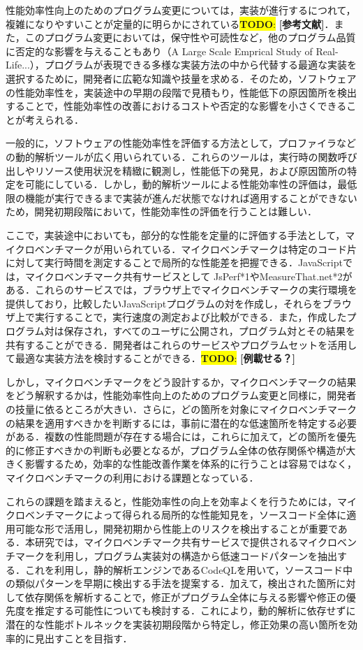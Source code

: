 \documentclass[submit,techrep,noauthor]{ipsj}
\newcommand{\todo}[1]{\colorbox{yellow}{{\bf TODO}:}{\color{red} {\textbf{[#1]}}}}
\begin{document}
性能効率性向上のためのプログラム変更については，実装が進行するにつれて，複雑になりやすいことが定量的に明らかにされている\todo{参考文献}．また，このプログラム変更においては，保守性や可読性など，他のプログラム品質に否定的な影響を与えることもあり（A Large Scale Emprical Study of Real-Life...），プログラムが表現できる多様な実装方法の中から代替する最適な実装を選択するために，開発者に広範な知識や技量を求める．そのため，ソフトウェアの性能効率性を，実装途中の早期の段階で見積もり，性能低下の原因箇所を検出することで，性能効率性の改善におけるコストや否定的な影響を小さくできることが考えられる． 

一般的に，ソフトウェアの性能効率性を評価する方法として，プロファイラなどの動的解析ツールが広く用いられている．これらのツールは，実行時の関数呼び出しやリソース使用状況を精緻に観測し，性能低下の発見，および原因箇所の特定を可能にしている．しかし，動的解析ツールによる性能効率性の評価は，最低限の機能が実行できるまで実装が進んだ状態でなければ適用することができないため，開発初期段階において，性能効率性の評価を行うことは難しい．

ここで，実装途中においても，部分的な性能を定量的に評価する手法として，マイクロベンチマークが用いられている．マイクロベンチマークは特定のコード片に対して実行時間を測定することで局所的な性能差を把握できる．JavaScriptでは，マイクロベンチマーク共有サービスとして JsPerf*1やMeasureThat.net*2がある．これらのサービスでは，ブラウザ上でマイクロベンチマークの実行環境を提供しており，比較したいJavaScriptプログラムの対を作成し，それらをブラウザ上で実行することで，実行速度の測定および比較ができる．また，作成したプログラム対は保存され，すべてのユーザに公開され，プログラム対とその結果を共有することができる．開発者はこれらのサービスやプログラムセットを活用して最適な実装方法を検討することができる．\todo{例載せる？}

しかし，マイクロベンチマークをどう設計するか，マイクロベンチマークの結果をどう解釈するかは，性能効率性向上のためのプログラム変更と同様に，開発者の技量に依るところが大きい．さらに，どの箇所を対象にマイクロベンチマークの結果を適用すべきかを判断するには，事前に潜在的な低速箇所を特定する必要がある．複数の性能問題が存在する場合には，これらに加えて，どの箇所を優先的に修正すべきかの判断も必要となるが，プログラム全体の依存関係や構造が大きく影響するため，効率的な性能改善作業を体系的に行うことは容易ではなく，マイクロベンチマークの利用における課題となっている．

これらの課題を踏まえると，性能効率性の向上を効率よくを行うためには，マイクロベンチマークによって得られる局所的な性能知見を，ソースコード全体に適用可能な形で活用し，開発初期から性能上のリスクを検出することが重要である．本研究では，マイクロベンチマーク共有サービスで提供されるマイクロベンチマークを利用し，プログラム実装対の構造から低速コードパターンを抽出する．これを利用し，静的解析エンジンであるCodeQLを用いて，ソースコード中の類似パターンを早期に検出する手法を提案する．加えて，検出された箇所に対して依存関係を解析することで，修正がプログラム全体に与える影響や修正の優先度を推定する可能性についても検討する．これにより，動的解析に依存せずに潜在的な性能ボトルネックを実装初期段階から特定し，修正効果の高い箇所を効率的に見出すことを目指す．
\end{document}
